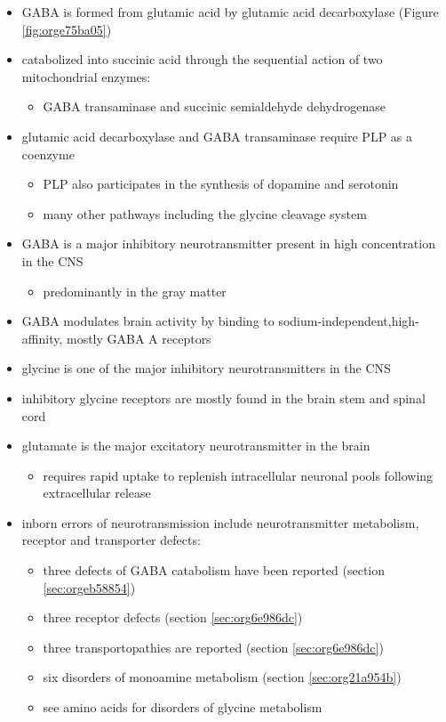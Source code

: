 \documentclass{scrartcl}
\begin{document}
\begin{itemize}
\item GABA is formed from glutamic acid by glutamic acid decarboxylase
(Figure \ref{fig:orge75ba05})
\item catabolized into succinic acid through the sequential action of two
mitochondrial enzymes:
\begin{itemize}
\item GABA transaminase and succinic semialdehyde dehydrogenase
\end{itemize}
\item glutamic acid decarboxylase and GABA transaminase require PLP as a coenzyme
\begin{itemize}
\item PLP also participates in the synthesis of dopamine and serotonin
\item many other pathways including the glycine cleavage system
\end{itemize}
\item GABA is a major inhibitory neurotransmitter present in high
concentration in the CNS
\begin{itemize}
\item predominantly in the gray matter
\end{itemize}
\item GABA modulates brain activity by binding to
sodium-independent,high-affinity, mostly GABA A receptors
\item glycine is one of the major inhibitory neurotransmitters in the CNS
\item inhibitory glycine receptors are mostly found in the brain stem
and spinal cord
\item glutamate is the major excitatory neurotransmitter in the brain
\begin{itemize}
\item requires rapid uptake to replenish intracellular
neuronal pools following extracellular release
\end{itemize}
\item inborn errors of neurotransmission include neurotransmitter
metabolism, receptor and transporter defects:
\begin{itemize}
\item three defects of GABA catabolism have been reported (section \ref{sec:orgeb58854})
\item three receptor defects (section \ref{sec:org6e986dc})
\item three transportopathies are reported (section \ref{sec:org6e986dc})
\item six disorders of monoamine metabolism (section \ref{sec:org21a954b})
\item see amino acids for disorders of glycine metabolism
\end{itemize}
\end{itemize}
\end{document}
